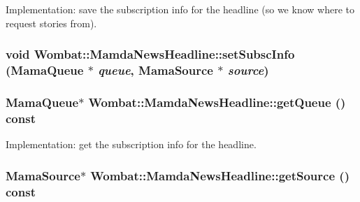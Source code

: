 Implementation: save the subscription info for the headline (so we know where to request stories from). 

\hypertarget{classWombat_1_1MamdaNewsHeadline_e63ea9779d2d075d6bb07fa3ed8e3eae}{
\subsubsection[setSubscInfo]{\setlength{\rightskip}{0pt plus 5cm}void Wombat::Mamda\-News\-Headline::set\-Subsc\-Info (Mama\-Queue $\ast$ {\em queue}, Mama\-Source $\ast$ {\em source})}}
\label{classWombat_1_1MamdaNewsHeadline_e63ea9779d2d075d6bb07fa3ed8e3eae}


\hypertarget{classWombat_1_1MamdaNewsHeadline_47ad2837648f2babb3e6d080575e6f8b}{
\subsubsection[getQueue]{\setlength{\rightskip}{0pt plus 5cm}Mama\-Queue$\ast$ Wombat::Mamda\-News\-Headline::get\-Queue () const}}
\label{classWombat_1_1MamdaNewsHeadline_47ad2837648f2babb3e6d080575e6f8b}


Implementation: get the subscription info for the headline. 

\hypertarget{classWombat_1_1MamdaNewsHeadline_b38caa0375235938ce1258c1bdd3b85b}{
\subsubsection[getSource]{\setlength{\rightskip}{0pt plus 5cm}Mama\-Source$\ast$ Wombat::Mamda\-News\-Headline::get\-Source () const}}
\label{classWombat_1_1MamdaNewsHeadline_b38caa0375235938ce1258c1bdd3b85b}


